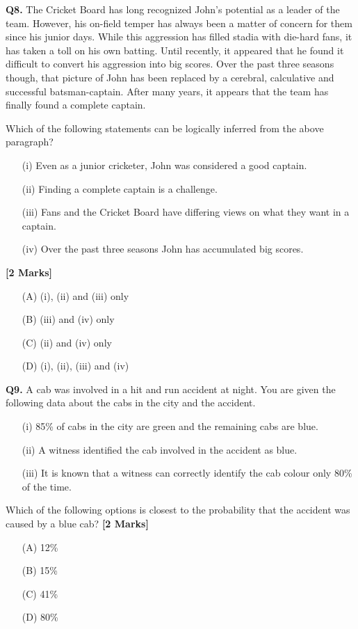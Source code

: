 \documentclass[11pt]{article}
\newcommand{\questionb}[2]{
    \noindent\textbf{Q#2.} #1 \hfill \textbf{[2 Marks]}
}
\begin{document}
\vspace{0.5cm}

\questionb{The Cricket Board has long recognized John's potential as a leader of the team. However, his on-field temper has always been a matter of concern for them since his junior days. While this aggression has filled stadia with die-hard fans, it has taken a toll on his own batting. Until recently, it appeared that he found it difficult to convert his aggression into big scores. Over the past three seasons though, that picture of John has been replaced by a cerebral, calculative and successful batsman-captain. After many years, it appears that the team has finally found a complete captain.

Which of the following statements can be logically inferred from the above paragraph?
\begin{enumerate}
    \item[(i)] Even as a junior cricketer, John was considered a good captain.
    \item[(ii)] Finding a complete captain is a challenge.
    \item[(iii)] Fans and the Cricket Board have differing views on what they want in a captain.
    \item[(iv)] Over the past three seasons John has accumulated big scores.
\end{enumerate}}{8}
\begin{enumerate}
    \item[(A)] (i), (ii) and (iii) only
    \item[(B)] (iii) and (iv) only
    \item[(C)] (ii) and (iv) only
    \item[(D)] (i), (ii), (iii) and (iv)
\end{enumerate}

\vspace{1cm}

\questionb{A cab was involved in a hit and run accident at night. You are given the following data about the cabs in the city and the accident.
\begin{enumerate}
    \item[(i)] 85\% of cabs in the city are green and the remaining cabs are blue.
    \item[(ii)] A witness identified the cab involved in the accident as blue.
    \item[(iii)] It is known that a witness can correctly identify the cab colour only 80\% of the time.
\end{enumerate}
Which of the following options is closest to the probability that the accident was caused by a blue cab?}{9}
\begin{enumerate}
    \item[(A)] 12\%
    \item[(B)] 15\%
    \item[(C)] 41\%
    \item[(D)] 80\%
\end{enumerate}
\end{document}
